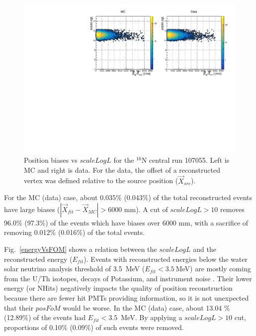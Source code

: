 \begin{figure}
	\centering
	\includegraphics[width=13cm]{N16_107055_scaleLogLvsPosBias.pdf}
	\caption[Position biases vs $scaleLogL$ for the $^{16}$N central run 107055.]{Position biases vs $scaleLogL$ for the $^{16}$N central run 107055. Left is MC and right is data. For the data, the offset of a reconstructed vertex was defined relative to the source position ($\vec{X}_{src}$).\label{posBiasVsFOM}}
\end{figure}

For the MC (data) case, about 0.035\% (0.043\%) of the total reconstructed events have large biases ($|\vec{X}_{fit}-\vec{X}_{MC}|>6000$ mm). A cut of $scaleLogL>10$ removes 96.0\% (97.3\%) of the events which have biases over 6000 mm, with a sacrifice of removing 0.012\% (0.016\%) of the total events.

Fig.~\ref{energyVsFOM} shows a relation between the $scaleLogL$ and the reconstructed energy ($E_{fit}$). Events with reconstructed energies below the water solar neutrino analysis threshold of 3.5~MeV ($E_{fit}<3.5~$MeV) are mostly coming from the U/Th isotopes, decays of Potassium, and instrument noise \cite{waterunidoc}. Their lower energy (or NHits) negatively impacts the quality of position reconstruction because there are fewer hit PMTs providing information, so it is not unexpected that their $posFoM$ would be worse. In the MC (data) case, about 13.04 \% (12.89\%) of the events had $E_{fit}<3.5$~MeV. By applying a $scaleLogL>10$ cut, proportions of 0.10\% (0.09\%) of such events were removed.

